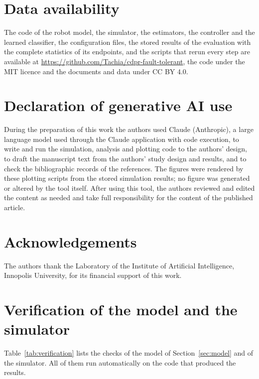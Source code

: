 \documentclass[a4paper,fleqn]{cas-dc}
\begin{document}
\section*{Data availability}
The code of the robot model, the simulator, the estimators, the controller and the learned classifier, the configuration files, the stored results of the evaluation with the complete statistics of its endpoints, and the scripts that rerun every step are available at \url{https://github.com/Tachia/cdpr-fault-tolerant}, the code under the MIT licence and the documents and data under CC BY 4.0.

\section*{Declaration of generative AI use}
During the preparation of this work the authors used Claude (Anthropic), a large language model used through the Claude application with code execution, to write and run the simulation, analysis and plotting code to the authors' design, to draft the manuscript text from the authors' study design and results, and to check the bibliographic records of the references. The figures were rendered by these plotting scripts from the stored simulation results; no figure was generated or altered by the tool itself. After using this tool, the authors reviewed and edited the content as needed and take full responsibility for the content of the published article.

\section*{Acknowledgements}
The authors thank the Laboratory of the Institute of Artificial Intelligence, Innopolis University, for its financial support of this work.

\appendix
\section{Verification of the model and the simulator}\label{app:verification}

Table~\ref{tab:verification} lists the checks of the model of Section~\ref{sec:model} and of the simulator. All of them run automatically on the code that produced the results.
\end{document}
